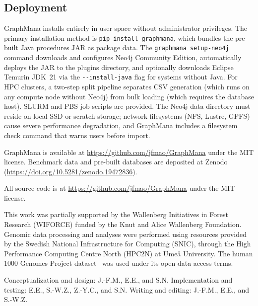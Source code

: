 \documentclass[pdflatex,sn-nature]{sn-jnl}
\newcommand{\code}[1]{\texttt{\small #1}}
\begin{document}
\subsection*{Deployment}

GraphMana installs entirely in user space without administrator privileges. The primary installation method is \code{pip install graphmana}, which bundles the pre-built Java procedures JAR as package data. The \code{graphmana setup-neo4j} command downloads and configures Neo4j Community Edition, automatically deploys the JAR to the plugins directory, and optionally downloads Eclipse Temurin JDK~21 via the \code{-{}-install-java} flag for systems without Java. For HPC clusters, a two-step split pipeline separates CSV generation (which runs on any compute node without Neo4j) from bulk loading (which requires the database host). SLURM and PBS job scripts are provided. The Neo4j data directory must reside on local SSD or scratch storage; network filesystems (NFS, Lustre, GPFS) cause severe performance degradation, and GraphMana includes a filesystem check command that warns users before import.

\backmatter


GraphMana is available at \url{https://github.com/jfmao/GraphMana} under the MIT license. Benchmark data and pre-built databases are deposited at Zenodo (\url{https://doi.org/10.5281/zenodo.19472836}).


All source code is at \url{https://github.com/jfmao/GraphMana} under the MIT license.


This work was partially supported by the Wallenberg Initiatives in Forest Research (WIFORCE) funded by the Knut and Alice Wallenberg Foundation. Genomic data processing and analyses were performed using resources provided by the Swedish National Infrastructure for Computing (SNIC), through the High Performance Computing Centre North (HPC2N) at Ume\aa{} University. The human 1000 Genomes Project dataset~\cite{byrska2022} was used under its open data access terms.


Conceptualization and design: J.-F.M., E.E., and S.N. Implementation and testing: E.E., S.-W.Z., Z.-Y.C., and S.N. Writing and editing: J.-F.M., E.E., and S.-W.Z.
\end{document}
